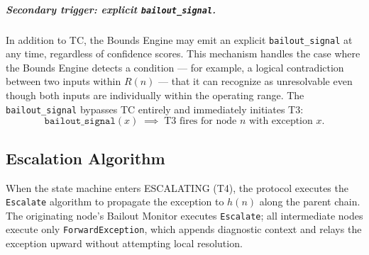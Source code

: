 \subparagraph{Secondary trigger: explicit \texttt{bailout\_signal}.} In addition to TC, the Bounds Engine may emit an explicit \texttt{bailout\_signal} at any time, regardless of confidence scores. This mechanism handles the case where the Bounds Engine detects a condition — for example, a logical contradiction between two inputs within $R(n)$ — that it can recognize as unresolvable even though both inputs are individually within the operating range. The \texttt{bailout\_signal} bypasses TC entirely and immediately initiates T3:
\begin{equation}
\texttt{bailout\_signal}(x) \;\implies\; \text{T3 fires for node } n \text{ with exception } x. \tag{TC-secondary}
\end{equation}

\subsection{Escalation Algorithm}\label{sec:escalation-algorithm}

When the state machine enters ESCALATING (T4), the protocol executes the \texttt{Escalate} algorithm to propagate the exception to $h(n)$ along the parent chain. The originating node's Bailout Monitor executes \texttt{Escalate}; all intermediate nodes execute only \texttt{ForwardException}, which appends diagnostic context and relays the exception upward without attempting local resolution.

